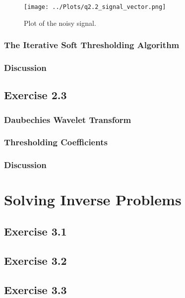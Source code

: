\documentclass[12pt]{report} %
\begin{document}
\begin{figure}[htbp]
    \centering
    \texttt{[image: ../Plots/q2.2\_signal\_vector.png]}
    \caption{Plot of the noisy signal.}
    \label{fig:noisy_signal}
\end{figure}


\subsection{The Iterative Soft Thresholding Algorithm}

\subsection{Discussion}

\section{Exercise 2.3}

\subsection{Daubechies Wavelet Transform}

\subsection{Thresholding Coefficients}

\subsection{Discussion}


\chapter{Solving Inverse Problems}

\section{Exercise 3.1}


\section{Exercise 3.2}


\section{Exercise 3.3}










\end{document}
